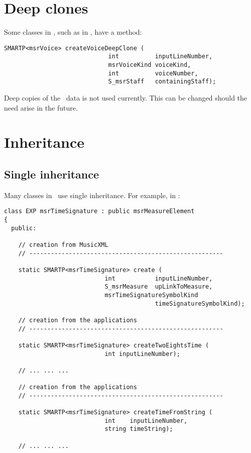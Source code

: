 \section{Deep clones}

Some classes in \mf, such as  in , have a  method:
\begin{lstlisting}[language=CPlusPlus]
     SMARTP<msrVoice> createVoiceDeepClone (
                             int          inputLineNumber,
                             msrVoiceKind voiceKind,
                             int          voiceNumber,
                             S_msrStaff   containingStaff);
\end{lstlisting}

Deep copies of the \msrRepr\ data is not used currently. This can be changed should the need arise in the future.


\section{Inheritance}

\subsection{Single inheritance}

Many classes in \mf\ use single inheritance. For example, in :
\begin{lstlisting}[language=CPlusPlus]
class EXP msrTimeSignature : public msrMeasureElement
{
  public:

    // creation from MusicXML
    // ------------------------------------------------------

    static SMARTP<msrTimeSignature> create (
                            int           inputLineNumber,
                            S_msrMeasure  upLinkToMeasure,
                            msrTimeSignatureSymbolKind
                                          timeSignatureSymbolKind);

    // creation from the applications
    // ------------------------------------------------------

    static SMARTP<msrTimeSignature> createTwoEightsTime (
                            int inputLineNumber);

    // ... ... ...

    // creation from the applications
    // ------------------------------------------------------

    static SMARTP<msrTimeSignature> createTimeFromString (
                            int    inputLineNumber,
                            string timeString);

    // ... ... ...
\end{lstlisting}

